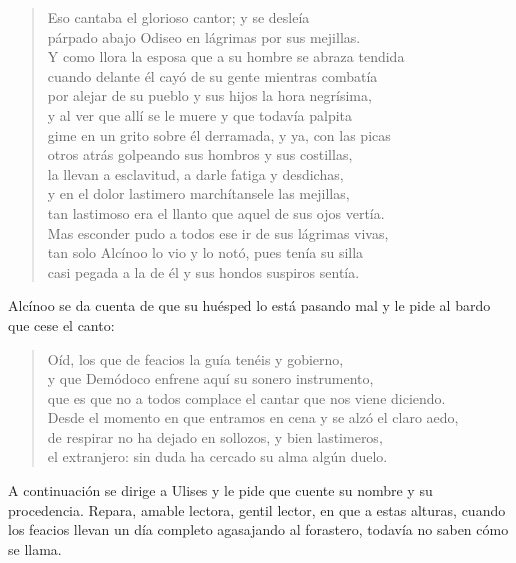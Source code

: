 \documentclass[11pt,a4paper]{article}
\begin{document}
\begin{verse}
Eso cantaba el glorioso cantor; y se desleía\\
párpado abajo Odiseo en lágrimas por sus mejillas.\\
Y como llora la esposa que a su hombre se abraza tendida\\
cuando delante él cayó de su gente mientras combatía\\
por alejar de su pueblo y sus hijos la hora negrísima,\\
y al ver que allí se le muere y que todavía palpita\\
gime en un grito sobre él derramada, y ya, con las picas\\
otros atrás golpeando sus hombros y sus costillas,\\
la llevan a esclavitud, a darle fatiga y desdichas,\\
y en el dolor lastimero marchítansele las mejillas,\\
tan lastimoso era el llanto que aquel de sus ojos vertía.\\
Mas esconder pudo a todos ese ir de sus lágrimas vivas,\\
tan solo Alcínoo lo vio y lo notó, pues tenía su silla\\
casi pegada a la de él y sus hondos suspiros sentía.
\end{verse}

Alcínoo se da cuenta de que su huésped lo está pasando mal y le pide al bardo que cese el canto:

\begin{verse}
Oíd, los que de feacios la guía tenéis y gobierno,\\
y que Demódoco enfrene aquí su sonero instrumento,\\
que es que no a todos complace el cantar que nos viene diciendo.\\
Desde el momento en que entramos en cena y se alzó el claro aedo,\\
de respirar no ha dejado en sollozos, y bien lastimeros,\\
el extranjero: sin duda ha cercado su alma algún duelo.
\end{verse}

A continuación se dirige a Ulises y le pide que cuente su nombre y su procedencia. Repara, amable lectora, gentil lector, en que a estas alturas, cuando los feacios llevan un día completo agasajando al forastero, todavía no saben cómo se llama.
\end{document}
